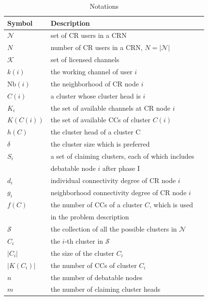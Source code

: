 \documentclass[times]{ettauth}
\theoremstyle{mytheoremstyle}
\theoremstyle{mytheoremstyle}
\theoremstyle{mytheoremstyle}
\begin{document}
\begin{table}[h!]
\caption{Notations}
\label{tab1}
\centering
\begin{tabular}{llr}
\toprule
Symbol & Description \\
\midrule
$\mathcal{N}$  & set of CR users in a CRN\\
$N$ & number of CR users in a CRN, $N=|\mathcal{N}|$\\
$\mathcal{K}$	& set of licensed channels\\
$k(i)$ & the working channel of user $i$\\
$\text{Nb}(i)$ & the neighborhood of CR node $i$    \\
$C(i)$ & a cluster whose cluster head is $i$  \\
$K_i$   & the set of available channels at CR node $i$  \\
$K(C(i))$   & the set of available CCs of cluster $C(i)$ \\
$h(C)$ & the cluster head of a cluster C\\
$\delta$ & the cluster size which is preferred\\
$S_i$ & a set of claiming clusters, each of which includes \\
& debatable node $i$ after phase I\\
$d_i$  & individual connectivity degree of CR node $i$\\
$g_i$  & neighborhood connectivity degree of CR node $i$\\
$f(C)$ & the number of CCs of a cluster $C$, which is used \\
& in the problem description\\
 $\mathcal{S}$ & the collection of all the possible clusters in $\mathcal{N}$\\
 $C_i$  & the $i$-th cluster in $\mathcal{S}$ \\
 $|C_i|$ & the size of the cluster $C_i$\\
 $|K(C_i)|$ & the number of CCs of cluster $C_i$\\
 $n$ & the number of debatable nodes\\
 $m$ & the number of claiming cluster heads\\
\bottomrule
\end{tabular}
\end{table}
\end{document}
